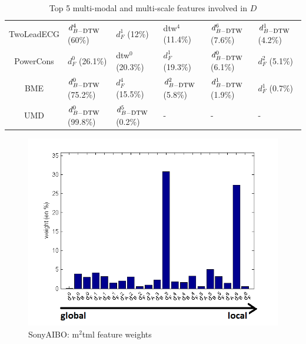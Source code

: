 \begin{table}[h!]
{\begin{tabular}{| c |  l l l l l |}
			TwoLeadECG 			& $d_{B-\mbox{\sc dtw}}^4$ (60\%)&   $d_F^1$ (12\%)&   {\sc dtw}$^4$ (11.4\%)&   $d_{B-\mbox{\sc dtw}}^6$ (7.6\%)&   $d_{B-\mbox{\sc dtw}}^1$ (4.2\%)
			\\
			PowerCons			& $d_F^0$ (26.1\%)&   {\sc dtw}$^0$ (20.3\%)&   $d_F^1$ (19.3\%)&   $d_{B-\mbox{\sc dtw}}^0$ (6.1\%)&   $d_F^2$ (5.1\%) 
			\\
			BME 				& $d_{B-\mbox{\sc dtw}}^0$ (75.2\%)&   $d_F^4$ (15.5\%)&   $d_{B-\mbox{\sc dtw}}^2$ (5.8\%)&   $d_{B-\mbox{\sc dtw}}^1$ (1.9\%)&   $d_F^1$ (0.7\%)   
			\\
			UMD 				& $d_{B-\mbox{\sc dtw}}^0$ (99.8\%)&   $d_{B-\mbox{\sc dtw}}^5$ (0.2\%)& -& -& -  \\
			\hline
		\end{tabular}
	}
	\caption{Top 5  multi-modal and multi-scale features involved in  $D$}
	\label{tab-feature}
\end{table}

\begin{figure}[h!]
	\centering
	\includegraphics[width=0.6\linewidth]{images/SonyAIBO_weight_V2}
	\caption{SonyAIBO:  {\sc m}$^2${\sc tml} feature weights}
	\label{fig:w}
\end{figure}

